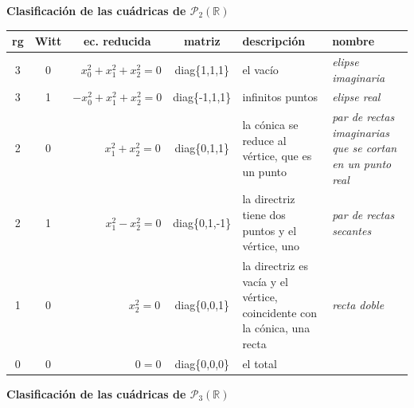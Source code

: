 \documentclass[12pt]{report}
\theoremstyle{definition}
\theoremstyle{definition}
\theoremstyle{remark}
\newcommand{\R}{\mathbb R}
\begin{document}
\begin{center} \textbf{Clasificación de las cuádricas de $\mathcal{P}_2(\R)$}

\vspace{6mm}

\footnotesize

\begin{tabular}{|c|c|c|c|m{4cm}|m{4cm}|}
    \hline
     \textbf{rg} & \textbf{Witt} & \textbf{ec. reducida} & \textbf{matriz} & \centering \textbf{descripción} & \centering \textbf{nombre} \tabularnewline
     \hline
     3 & 0 & $ \ \; \: x_0^2+x_1^2+x_2^2 = 0$ & diag\{1,1,1\} & \scriptsize el vacío & \textit{elipse imaginaria} \\
     \hline
     3 & 1 & $-x_0^2+x_1^2+x_2^2 = 0$ & diag\{-1,1,1\} & \scriptsize infinitos puntos & \textit{elipse real} \\
     \hline
     2 & 0 & $\qquad \ \ \, \, x_1^2+x_2^2 = 0$ & diag\{0,1,1\} & \scriptsize la cónica se reduce al vértice, que es un punto & \textit{par de rectas imaginarias que se cortan en un punto real} \\
     \hline
     2 & 1 & $\qquad \: \: \: \: x_1^2-x_2^2 = 0$ & diag\{0,1,-1\} & \scriptsize la directriz tiene dos puntos y el vértice, uno & \textit{par de rectas secantes} \\
     \hline
     1 & 0 & $\qquad \qquad \ \ \; \, x_2^2 = 0$ & diag\{0,0,1\} & \scriptsize la directriz es vacía y el vértice, coincidente con la cónica, una recta & \textit{recta doble} \\
     \hline
     0 & 0 & $\qquad \qquad \quad \: \, \, 0 = 0$ & diag\{0,0,0\} & \scriptsize el total & \\
     \hline
\end{tabular}

\normalsize

\vspace{24mm}

\textbf{Clasificación de las cuádricas de $\mathcal{P}_3(\R)$}

\vspace{6mm}

\footnotesize


\end{center}
\end{document}
